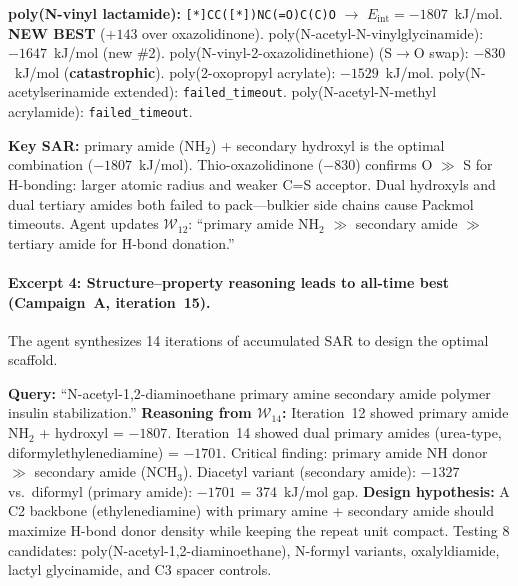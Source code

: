 \documentclass[twocolumn]{fairmeta}
\begin{document}
\begin{toolcall}
\scriptsize
\textbf{poly(N-vinyl lactamide):} \texttt{[*]CC([*])NC(=O)C(C)O} $\to$ $E_\text{int} = -1807$~kJ/mol. \textbf{NEW BEST} ($+143$ over oxazolidinone).
poly(N-acetyl-N-vinylglycinamide): $-1647$~kJ/mol (new \#2).
poly(N-vinyl-2-oxazolidinethione) (S$\to$O swap): $-830$~kJ/mol (\textbf{catastrophic}).
poly(2-oxopropyl acrylate): $-1529$~kJ/mol.
poly(N-acetylserinamide extended): \texttt{failed\_timeout}.
poly(N-acetyl-N-methyl acrylamide): \texttt{failed\_timeout}.
\end{toolcall}

\begin{observation}
\scriptsize
\textbf{Key SAR:} primary amide (NH$_2$) + secondary hydroxyl is the optimal combination ($-1807$~kJ/mol).
Thio-oxazolidinone ($-830$) confirms O $\gg$ S for H-bonding: larger atomic radius and weaker C=S acceptor.
Dual hydroxyls and dual tertiary amides both failed to pack---bulkier side chains cause Packmol timeouts.
Agent updates $\mathcal{W}_{12}$: ``primary amide NH$_2$ $\gg$ secondary amide $\gg$ tertiary amide for H-bond donation.''
\end{observation}

\paragraph{Excerpt 4: Structure--property reasoning leads to all-time best (Campaign~A, iteration~15).}
The agent synthesizes 14 iterations of accumulated SAR to design the optimal scaffold.

\begin{agentthought}
\scriptsize
\textbf{Query:} ``N-acetyl-1,2-diaminoethane primary amine secondary amide polymer insulin stabilization.''
\textbf{Reasoning from $\mathcal{W}_{14}$:}
Iteration~12 showed primary amide NH$_2$ + hydroxyl = $-1807$.
Iteration~14 showed dual primary amides (urea-type, diformylethylenediamine) = $-1701$.
Critical finding: primary amide NH donor $\gg$ secondary amide (NCH$_3$).
Diacetyl variant (secondary amide): $-1327$ vs.\ diformyl (primary amide): $-1701$ = 374~kJ/mol gap.
\textbf{Design hypothesis:} A C2 backbone (ethylenediamine) with primary amine + secondary amide should maximize H-bond donor density while keeping the repeat unit compact.
Testing 8 candidates: poly(N-acetyl-1,2-diaminoethane), N-formyl variants, oxalyldiamide, lactyl glycinamide, and C3 spacer controls.
\end{agentthought}
\end{document}
